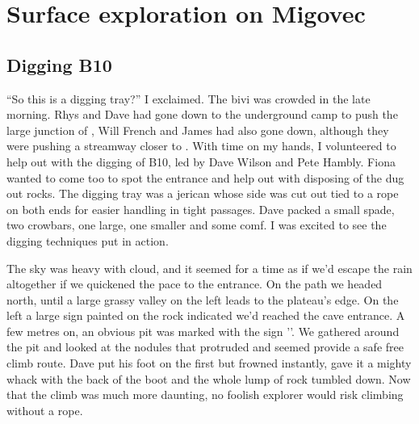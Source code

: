 \begin{marginfigure}
\end{marginfigure}
\section{Surface exploration on Migovec}
\subsection{Digging B10}
``So this is a digging tray?'' I exclaimed. The bivi was crowded in the late morning. Rhys and Dave had gone down to the underground camp to push the large junction of , Will French and James had also gone down, although they were pushing a streamway closer to . With time on my hands, I volunteered to help out with the digging of B10, led by Dave Wilson and Pete Hambly. Fiona wanted to come too to spot the entrance and help out with disposing of the dug out rocks. The digging tray was a jerican whose side was cut out tied to a rope on both ends for easier handling in tight passages. Dave packed a small spade, two crowbars, one large, one smaller and some comf. I was excited to see the digging techniques put in action.

The sky was heavy with cloud, and it seemed for a time as if we'd escape the rain altogether if we quickened the pace to the entrance. On the  path we headed north, until a large grassy valley on the left leads to the plateau's edge. On the left a large sign painted on the rock indicated we'd reached the cave entrance. A few metres on, an obvious pit was marked with the sign ''.  We gathered around the pit and looked at the nodules that protruded and seemed provide a safe free climb route. Dave put his foot on the first but frowned instantly, gave it a mighty whack with the back of the boot and the whole lump of rock tumbled down. Now that the climb was much more daunting, no foolish explorer would risk climbing without a rope.

